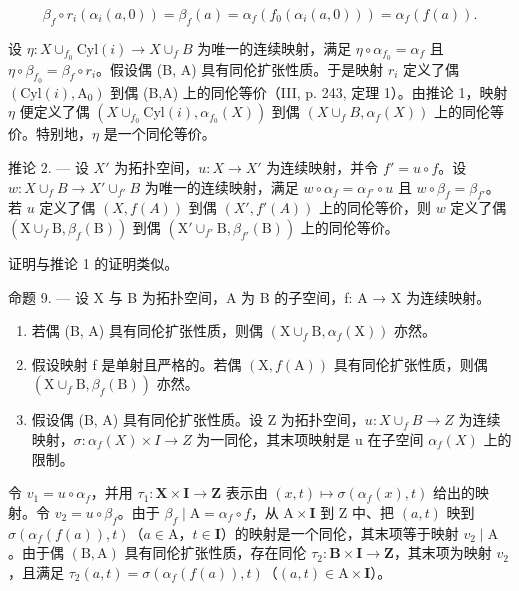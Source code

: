\[
\beta_ {f} \circ r _ {i} (\alpha_ {i} (a, 0)) = \beta_ {f} (a) = \alpha_ {f} (f _ {0} (\alpha_ {i} (a, 0))) = \alpha_ {f} (f (a)).
\]

设 \(\eta\colon X\cup_{f_0}\mathrm{Cyl}(i)\to X\cup_fB\) 为唯一的连续映射，满足 \(\eta\circ\alpha_{f_0}=\alpha_f\) 且 \(\eta\circ\beta_{f_0}=\beta_f\circ r_i\)。假设偶 (B, A) 具有同伦扩张性质。于是映射 \(r_i\) 定义了偶 \((\mathrm{Cyl}(i),\mathrm{A}_0)\) 到偶 (B,A) 上的同伦等价（III, p. 243, 定理 1）。由推论 1，映射 \(\eta\) 便定义了偶 \((X\cup_{f_0}\mathrm{Cyl}(i),\alpha_{f_0}(X))\) 到偶 \((X\cup_fB,\alpha_f(X))\) 上的同伦等价。特别地，\(\eta\) 是一个同伦等价。

推论 2. --- 设 \(X'\) 为拓扑空间，\(u: X \to X'\) 为连续映射，并令 \(f' = u \circ f\)。设 \(w: X \cup_f B \to X' \cup_{f'} B\) 为唯一的连续映射，满足 \(w \circ \alpha_f = \alpha_{f'} \circ u\) 且 \(w \circ \beta_f = \beta_{f'}\)。若 \(u\) 定义了偶 \((X, f(A))\) 到偶 \((X', f'(A))\) 上的同伦等价，则 \(w\) 定义了偶 \((\mathrm{X}\cup_f\mathrm{B},\beta_f(\mathrm{B}))\) 到偶 \((\mathrm{X}'\cup_{f'}\mathrm{B},\beta_{f'}(\mathrm{B}))\) 上的同伦等价。

证明与推论 1 的证明类似。

命题 9. --- 设 X 与 B 为拓扑空间，A 为 B 的子空间，f: A → X 为连续映射。

\begin{enumerate}
\def\labelenumi{\alph{enumi})}
\item
  若偶 (B, A) 具有同伦扩张性质，则偶 \((\mathrm{X} \cup_{f} \mathrm{B}, \alpha_{f}(\mathrm{X}))\) 亦然。
\item
  假设映射 f 是单射且严格的。若偶 \((\mathrm{X}, f(\mathrm{A}))\) 具有同伦扩张性质，则偶 \((\mathrm{X} \cup_{f} \mathrm{B}, \beta_{f}(\mathrm{B}))\) 亦然。
\item
  假设偶 (B, A) 具有同伦扩张性质。设 Z 为拓扑空间，\(u: X \cup_{f} B \to Z\) 为连续映射，\(\sigma: \alpha_{f}(X) \times I \to Z\) 为一同伦，其末项映射是 u 在子空间 \(\alpha_{f}(X)\) 上的限制。
\end{enumerate}

令 \(v_{1} = u \circ \alpha_{f}\)，并用 \(\tau_{1} \colon \mathbf{X} \times \mathbf{I} \to \mathbf{Z}\) 表示由 \((x,t) \mapsto \sigma(\alpha_{f}(x),t)\) 给出的映射。令 \(v_{2} = u \circ \beta_{f}\)。由于 \(\beta_{f} \mid \mathrm{A} = \alpha_{f} \circ f\)，从 \(\mathrm{A} \times \mathbf{I}\) 到 \(\mathrm{Z}\) 中、把 \((a,t)\) 映到 \(\sigma(\alpha_{f}(f(a)),t)\)（\(a \in \mathrm{A}\)，\(t \in \mathbf{I}\)）的映射是一个同伦，其末项等于映射 \(v_{2} \mid \mathrm{A}\)。由于偶 \((\mathrm{B},\mathrm{A})\) 具有同伦扩张性质，存在同伦 \(\tau_{2} \colon \mathbf{B} \times \mathbf{I} \to \mathbf{Z}\)，其末项为映射 \(v_{2}\)，且满足 \(\tau_{2}(a,t) = \sigma(\alpha_{f}(f(a)),t)\)（\((a,t) \in \mathrm{A} \times \mathbf{I}\)）。

